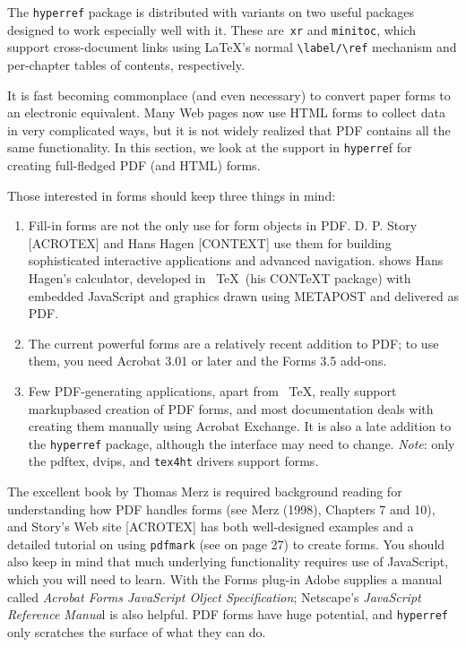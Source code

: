 The \verb|hyperref| package is distributed with variants on two useful packages
designed to work especially well with it. These are\verb| xr| and \verb|minitoc|, which
support cross-document links using  \LaTeX's normal \verb|\label/\ref| mechanism
and per-chapter tables of contents, respectively. 

 

It is fast becoming commonplace (and even necessary) to convert paper forms to 
an electronic equivalent. Many Web pages now use HTML forms to collect data 
in very complicated ways, but it is not widely realized that PDF contains all the 
same functionality. In this section, we look at the support in \verb|hyperre|f for creating 
full-fledged PDF (and HTML) forms. 

Those interested in forms should keep three things in mind: 

\begin{enumerate}
  \item  Fill-in forms are not the only use for form objects in PDF. D. P. Story 
    [ACROTEX] and Hans Hagen [CONTEXT] use them for building sophisticated interactive applications and advanced navigation.  shows Hans 
    Hagen's calculator, developed in \ \TeX\  (his CON\TeX T package) with embedded 
    JavaScript and graphics drawn using METAPOST and delivered as PDF. 
  \item  The current powerful forms are a relatively recent addition to PDF; to use 
    them, you need Acrobat 3.01 or later and the Forms 3.5 add-ons. 
  \item Few PDF-generating applications, apart from \ \TeX, really support markupbased creation of PDF forms, and most documentation deals with creating them 
    manually using Acrobat Exchange. It is also a late addition to the \verb|hyperref| 
    package, although the interface may need to change. \emph{Note}: only the pdftex, 
    dvips, and \verb|tex4ht| drivers support forms. 
\end{enumerate}

The excellent book by Thomas Merz is required background reading for
understanding how PDF handles forms (see Merz (1998), Chapters 7 and
10), and Story's Web site [ACROTEX] has both well-designed examples and
a detailed tutorial on using \verb|pdfmark| (see  on page 27)
to create forms. You should also keep in mind that much underlying
functionality requires use of JavaScript, which you will need to learn.
With the Forms plug-in Adobe supplies a manual called \emph{Acrobat
Forms JavaScript Olject Specification}; Netscape's \emph{JavaScript
Reference Manua}l is also helpful. PDF forms have huge potential, and
\verb|hyperref| only scratches the surface of what they can do.  

